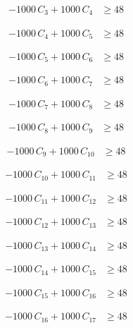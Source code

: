 \documentclass[a4paper,11pt]{article}
\begin{document}
\begin{align}
-1000\,C_{3} + 1000\,C_{4} &\geq 48 \nonumber
\end{align}

\begin{align}
-1000\,C_{4} + 1000\,C_{5} &\geq 48 \nonumber
\end{align}

\begin{align}
-1000\,C_{5} + 1000\,C_{6} &\geq 48 \nonumber
\end{align}

\begin{align}
-1000\,C_{6} + 1000\,C_{7} &\geq 48 \nonumber
\end{align}

\begin{align}
-1000\,C_{7} + 1000\,C_{8} &\geq 48 \nonumber
\end{align}

\begin{align}
-1000\,C_{8} + 1000\,C_{9} &\geq 48 \nonumber
\end{align}

\begin{align}
-1000\,C_{9} + 1000\,C_{10} &\geq 48 \nonumber
\end{align}

\begin{align}
-1000\,C_{10} + 1000\,C_{11} &\geq 48 \nonumber
\end{align}

\begin{align}
-1000\,C_{11} + 1000\,C_{12} &\geq 48 \nonumber
\end{align}

\begin{align}
-1000\,C_{12} + 1000\,C_{13} &\geq 48 \nonumber
\end{align}

\begin{align}
-1000\,C_{13} + 1000\,C_{14} &\geq 48 \nonumber
\end{align}

\begin{align}
-1000\,C_{14} + 1000\,C_{15} &\geq 48 \nonumber
\end{align}

\begin{align}
-1000\,C_{15} + 1000\,C_{16} &\geq 48 \nonumber
\end{align}

\begin{align}
-1000\,C_{16} + 1000\,C_{17} &\geq 48 \nonumber
\end{align}
\end{document}
